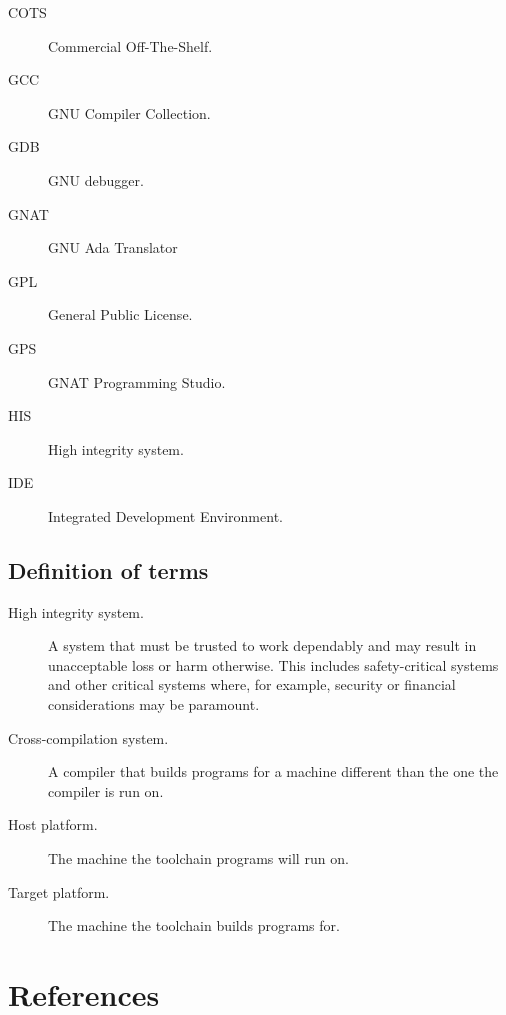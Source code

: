 \begin{description}
\item[COTS]  Commercial Off-The-Shelf. 
\item[GCC]   GNU Compiler Collection.
\item[GDB]   GNU debugger.
\item[GNAT]  GNU Ada Translator
\item[GPL]   General Public License.
\item[GPS]   GNAT Programming Studio.
\item[HIS]   High integrity system.
\item[IDE]   Integrated Development Environment.
\end{description}

\subsection{Definition of terms}

\begin{description}
\item[High integrity system.] A system that must be trusted to work
  dependably and may result in unacceptable loss or harm
  otherwise. This includes safety-critical systems and other critical
  systems where, for example, security or financial considerations may
  be paramount.
\item[Cross-compilation system.] A compiler that builds programs for a
  machine different than the one the compiler is run on.
\item[Host platform.] The machine the toolchain programs will run on.
\item[Target platform.] The machine the toolchain builds programs for.
\end{description}

\section{References}

